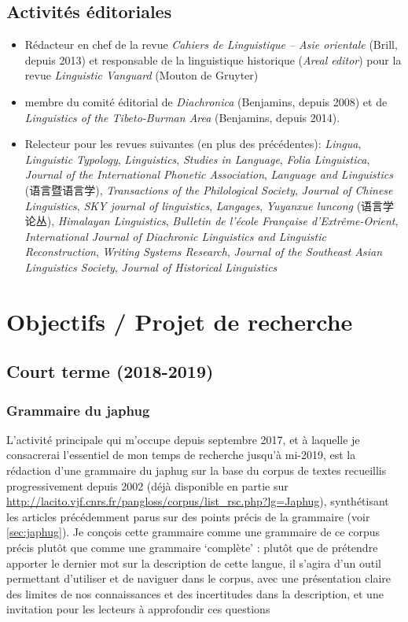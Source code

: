 \documentclass[oldfontcommands,oneside,a4paper,11pt]{article}
\newcommand{\zh}[1]{{\cn #1}}
\begin{document}
\subsection{Activités éditoriales}
\begin{itemize}
\item Rédacteur en chef de la revue \textit{Cahiers de Linguistique -- Asie orientale} (Brill, depuis 2013) et responsable de la linguistique historique (\textit{Areal editor}) pour la revue \textit{Linguistic Vanguard} (Mouton de Gruyter)
\item membre du comité éditorial de \textit{Diachronica} (Benjamins, depuis 2008) et de \textit{Linguistics of the Tibeto-Burman Area}  (Benjamins, depuis 2014).
\item Relecteur pour les revues suivantes (en plus des précédentes):  \textit{Lingua}, \textit{Linguistic Typology}, \textit{Linguistics}, \textit{Studies in Language}, \textit{Folia Linguistica}, \textit{Journal of the International Phonetic Association},  \textit{Language and Linguistics} (\zh{语言暨语言学}), \textit{Transactions of the Philological Society}, \textit{Journal of Chinese Linguistics}, \textit{SKY journal of linguistics}, \textit{Langages}, \textit{Yuyanxue luncong} (\zh{语言学论丛}), 	\textit{Himalayan Linguistics}, \textit{Bulletin de l’école Française d’Extrême-Orient}, 	\textit{International Journal of Diachronic Linguistics and Linguistic Reconstruction}, \textit{Writing Systems Research}, 	\textit{Journal of the Southeast Asian Linguistics Society}, \textit{Journal of Historical Linguistics}
\end{itemize}

\section{Objectifs / Projet de recherche}

\subsection{Court terme (2018-2019)}

\subsubsection{Grammaire du japhug}
L'activité principale qui m'occupe depuis septembre 2017, et à laquelle je consacrerai l'essentiel de mon temps de recherche jusqu'à mi-2019, est la rédaction d'une grammaire du japhug sur la base du corpus de textes recueillis progressivement depuis 2002 (déjà disponible en partie sur \url{http://lacito.vjf.cnrs.fr/pangloss/corpus/list\_rsc.php?lg=Japhug}), synthétisant les articles précédemment parus sur des points précis de la grammaire (voir \ref{sec:japhug}). Je conçois cette grammaire comme une grammaire de ce corpus précis plutôt que comme une grammaire `complète' : plutôt que de prétendre apporter le dernier mot sur la description de cette langue, il s'agira d'un outil permettant d'utiliser et de naviguer dans le corpus, avec une présentation claire des limites de nos connaissances et des incertitudes dans la description, et une invitation pour les lecteurs à approfondir ces questions 
\end{document}
